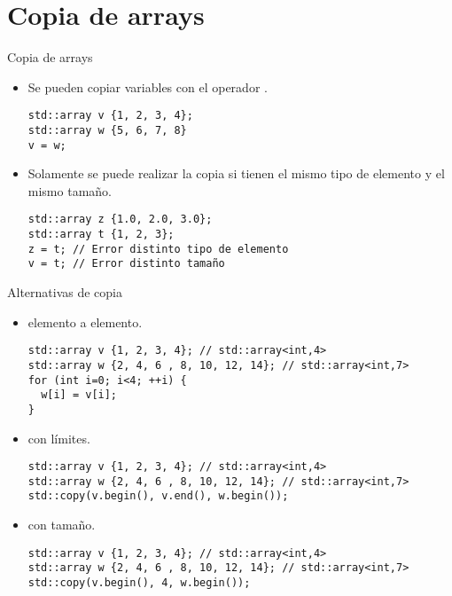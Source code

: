 \section{Copia de arrays}

\begin{frame}[t,fragile]{Copia de arrays}
\begin{itemize}
  \item Se pueden copiar variables  con el operador \cppkey{=}.
\begin{lstlisting}
std::array v {1, 2, 3, 4};
std::array w {5, 6, 7, 8}
v = w;
\end{lstlisting}

  \item Solamente se puede realizar la copia si tienen el mismo tipo de elemento
        y el mismo tamaño.
\begin{lstlisting}
std::array z {1.0, 2.0, 3.0};
std::array t {1, 2, 3};
z = t; // Error distinto tipo de elemento
v = t; // Error distinto tamaño
\end{lstlisting}
\end{itemize}
\end{frame}

\begin{frame}[t,fragile]{Alternativas de copia}
\begin{itemize}
  \item {} elemento a elemento.
\begin{lstlisting}
std::array v {1, 2, 3, 4}; // std::array<int,4>
std::array w {2, 4, 6 , 8, 10, 12, 14}; // std::array<int,7>
for (int i=0; i<4; ++i) {
  w[i] = v[i];
}
\end{lstlisting}

  \item {} con límites.
\begin{lstlisting}
std::array v {1, 2, 3, 4}; // std::array<int,4>
std::array w {2, 4, 6 , 8, 10, 12, 14}; // std::array<int,7>
std::copy(v.begin(), v.end(), w.begin());
\end{lstlisting}

  \item {} con tamaño.
\begin{lstlisting}
std::array v {1, 2, 3, 4}; // std::array<int,4>
std::array w {2, 4, 6 , 8, 10, 12, 14}; // std::array<int,7>
std::copy(v.begin(), 4, w.begin());
\end{lstlisting}
\end{itemize}
\end{frame}

